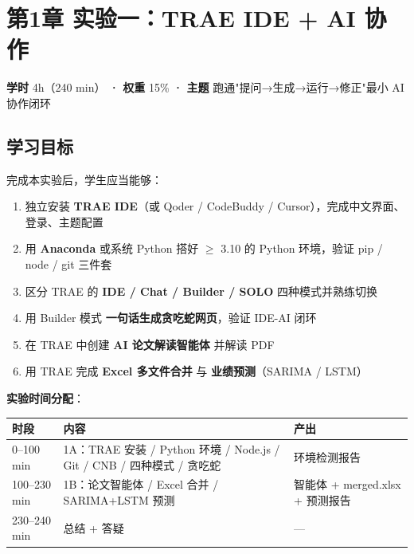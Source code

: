 \documentclass[12pt,a4paper]{ctexart}
\begin{document}
\clearpage

\section{第1章 实验一：TRAE IDE + AI 协作}

\textbf{学时} 4h（240 min） \textbf{·} \textbf{权重} 15\% \textbf{·} \textbf{主题} 跑通"提问→生成→运行→修正"最小 AI 协作闭环

\subsection{学习目标}

完成本实验后，学生应当能够：

\begin{enumerate}[leftmargin=2em]
  \item 独立安装 \textbf{TRAE IDE}（或 Qoder / CodeBuddy / Cursor），完成中文界面、登录、主题配置
  \item 用 \textbf{Anaconda} 或系统 Python 搭好 $\geq$ 3.10 的 Python 环境，验证 pip / node / git 三件套
  \item 区分 TRAE 的 \textbf{IDE / Chat / Builder / SOLO} 四种模式并熟练切换
  \item 用 Builder 模式 \textbf{一句话生成贪吃蛇网页}，验证 IDE-AI 闭环
  \item 在 TRAE 中创建 \textbf{AI 论文解读智能体} 并解读 PDF
  \item 用 TRAE 完成 \textbf{Excel 多文件合并} 与 \textbf{业绩预测}（SARIMA / LSTM）
\end{enumerate}

\textbf{实验时间分配}：

\begin{table}[H]
\centering
\begin{tabular}{lp{6cm}l}
\toprule
\textbf{时段} & \textbf{内容} & \textbf{产出} \\
\midrule
0--100 min & 1A：TRAE 安装 / Python 环境 / Node.js / Git / CNB / 四种模式 / 贪吃蛇 & 环境检测报告 \\
100--230 min & 1B：论文智能体 / Excel 合并 / SARIMA+LSTM 预测 & 智能体 + merged.xlsx + 预测报告 \\
230--240 min & 总结 + 答疑 & --- \\
\bottomrule
\end{tabular}
\end{table}
\end{document}
